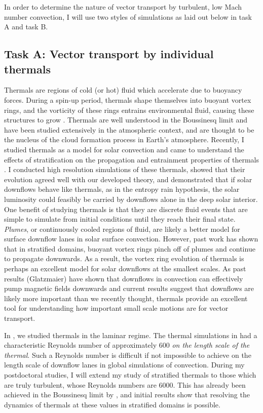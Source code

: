 \documentclass[aasms,12pt]{article}
\begin{document}
In order to determine the nature of vector transport by turbulent, low Mach number convection, I will use two styles of simulations as laid out below in task A and task B.

\subsection{Task A: Vector transport by individual thermals}
Thermals are regions of cold (or hot) fluid which accelerate due to buoyancy forces.
During a spin-up period, thermals shape themselves into buoyant vortex rings, and the vorticity of these rings entrains environmental fluid, causing these structures to grow \citep{lecoanet&jeevanjee2019}.
Thermals are well understood in the Boussinesq limit and have been studied extensively in the atmospheric context, and are thought to be the nucleus of the cloud formation process in Earth's atmosphere.
Recently, I studied thermals as a model for solar convection and came to understand the effects of stratification on the propagation and entrainment properties of thermals \citep{andersLB2019}.
I conducted high resolution simulations of these thermals, showed that their evolution agreed well with our developed theory, and demonstrated that if solar downflows behave like thermals, as in the entropy rain hypothesis, the solar luminosity could feasibly be carried by downflows alone in the deep solar interior.
One benefit of studying thermals is that they are discrete fluid events that are simple to simulate from initial conditions until they reach their final state.
\emph{Plumes}, or continuously cooled regions of fluid, are likely a better model for surface downflow lanes in solar surface convection.
However, past work has shown that in stratified domains, buoyant vortex rings pinch off of plumes and continue to propagate downwards.
As a result, the vortex ring evolution of thermals is perhaps an excellent model for solar downflows at the smallest scales.
As past results (Glatzmaier) have shown that downflows in convection can effectively pump magnetic fields downwards and current results \citep{kapyla&all2017} suggest that downflows are likely more important than we recently thought, thermals provide an excellent tool for understanding how important small scale motions are for vector transport.

In \citep{andersLB2019}, we studied thermals in the laminar regime.
The thermal simulations in \citet{andersLB2019} had a characteristic Reynolds number of approximately 600 \emph{on the length scale of the thermal}.
Such a Reynolds number is difficult if not impossible to achieve on the length scale of downflow lanes in global simulations of convection.
During my postdoctoral studies, I will extend my study of stratified thermals to those which are truly turbulent, whose Reynolds numbers are 6000.
This has already been achieved in the Boussinesq limit by \citet{lecoanet&jeevanjee2019}, and initial results show that resolving the dynamics of thermals at these values in stratified domains is possible.
\end{document}
